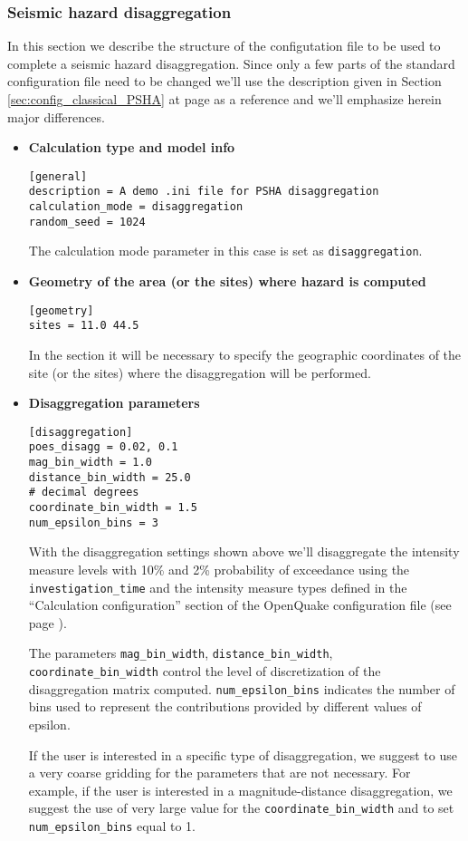 \subsubsection{Seismic hazard disaggregation}
%
In this section we describe the structure of the configutation 
file to be used to complete a seismic hazard disaggregation. 
Since only a few parts of the standard configuration file need to 
be changed we'll use the description given in Section 
\ref{sec:config_classical_PSHA} at page 
\pageref{sec:config_classical_PSHA} as a reference and we'll 
emphasize herein major differences.
%
\begin{itemize}
%
\item \textbf{Calculation type and model info}
\begin{Verbatim}[frame=single, commandchars=\\\{\}, fontsize=\small]
[general]
description = A demo .ini file for PSHA disaggregation
calculation_mode = disaggregation
random_seed = 1024
\end{Verbatim}
The calculation mode parameter in this case is set as 
\texttt{disaggregation}.
%
\item \textbf{Geometry of the area (or the sites) where hazard is computed}
\begin{Verbatim}[frame=single, commandchars=\\\{\}, fontsize=\small]
[geometry]
sites = 11.0 44.5
\end{Verbatim}

In the section it will be necessary to specify the geographic 
coordinates of the site (or the sites) where the disaggregation
will be performed.
%
\item \textbf{Disaggregation parameters}
\begin{Verbatim}[frame=single, commandchars=\\\{\}, fontsize=\small]
[disaggregation]
poes_disagg = 0.02, 0.1
mag_bin_width = 1.0
distance_bin_width = 25.0
# decimal degrees
coordinate_bin_width = 1.5
num_epsilon_bins = 3
\end{Verbatim}
With the disaggregation settings shown above we'll disaggregate the intensity
measure levels with 10\% and 2\% probability of exceedance using the
\texttt{in\-ves\-ti\-gation\_time} and the intensity measure types 
defined in the ``Calculation configuration'' section of the OpenQuake
configuration file (see page \pageref{sec:calculation_configuration}). 

The parameters \texttt{mag\_bin\_width},  \texttt{distance\_bin\_width},
\texttt{coordinate\_bin\_width} control the level of discretization of the
disaggregation matrix computed. \texttt{num\_epsilon\_bins} indicates the 
number of bins used to represent the contributions provided by different
values of epsilon.

If the user is interested in a specific type of disaggregation,
we suggest to use a very coarse gridding for the parameters that are 
not necessary. For example, if the user is interested in a magnitude-distance 
disaggregation, we suggest the use of very large value for the 
\texttt{coordinate\_\-bin\_\-width} and to set  \texttt{num\_epsilon\_bins}
equal to 1.
\end{itemize}
